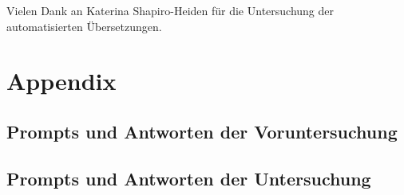 \documentclass[acmlarge,authorversion,nonacm]{acmart}
\begin{document}
\begin{acks}
Vielen Dank an Katerina Shapiro-Heiden für die Untersuchung der automatisierten Übersetzungen.
\end{acks}




\newpage
\appendix

\section{Appendix}

\subsection{Prompts und Antworten der Voruntersuchung}


\subsection{Prompts und Antworten der Untersuchung}
\end{document}

